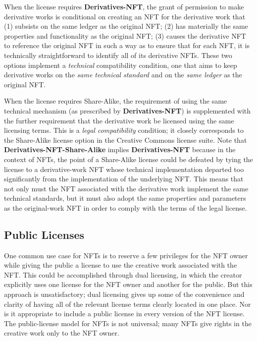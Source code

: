 \documentclass{article}
\newcommand{\keyword}[1]{\textbf{#1}\xspace}
\newcommand{\derivativetracking}{\keyword{Derivatives-NFT}}
\newcommand{\sharealike}{\keyword{Derivatives-NFT-Share-Alike}}
\begin{document}
When the license requires \derivativetracking, the grant of permission to make derivative works is conditional on creating an NFT for the derivative work that (1) subsists on the same ledger as the original NFT; (2) has materially the same properties and functionality as the original NFT; (3) causes the derivative NFT to reference the original NFT in such a way as to ensure that for each NFT, it is technically straightforward to identify all of its derivative NFTs. These two options implement a \emph{technical} compatibility condition, one that aims to keep derivative works on the \emph{same technical standard} and on the \emph{same ledger} as the original NFT. 

When the license requires Share-Alike, the requirement of using the same technical mechanism (as prescribed by \derivativetracking) is supplemented with the further requirement that the derivative work be licensed using the same licensing terms. This is a \emph{legal compatibility} condition; it closely corresponds to the Share-Alike license option in the Creative Commons license suite. Note that \sharealike implies \derivativetracking because in the context of NFTs, the point of a Share-Alike license could be defeated by tying the license to a derivative-work NFT whose technical implementation departed too significantly from the implementation of the underlying NFT. This means that not only must the NFT associated with the derivative work implement the same technical standards, but it must also adopt the same properties and parameters as the original-work NFT in order to comply with the terms of the legal license.

\subsection{Public Licenses}

One common use case for NFTs is to reserve a few privileges for the NFT owner while giving the public a license to use the creative work associated with the NFT. This could be accomplished through dual licensing, in which the creator explicitly uses one license for the NFT owner and another for the public. But this approach is unsatisfactory; dual licensing gives up some of the convenience and clarity of having all of the relevant license terms clearly located in one place. Nor is it appropriate to include a public license in every version of the NFT license. The public-license model for NFTs is not universal; many NFTs give rights in the creative work only to the NFT owner.
\end{document}
